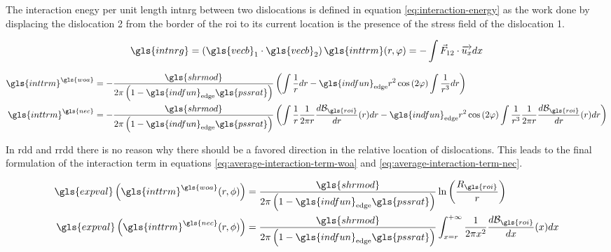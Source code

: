 \bigskip

The interaction enegy per unit length \gls{intnrg} between two dislocations is defined in equation \eqref{eq:interaction-energy} as the work done by displacing the dislocation 2 from the border of the \gls{roi} to its current location is the presence of the stress field of the dislocation 1.

\begin{equation}\label{eq:interaction-energy}
  \gls{intnrg} =
  \left( \gls{vecb}_1 \cdot \gls{vecb}_2 \right) \gls{inttrm}(r, \varphi) =
  - \int \vec{F}_{1 2} \cdot \ux dx
\end{equation}

\begin{align}
  \gls{inttrm}^{\gls{woa}} &=
    - \frac{\gls{shrmod}}{2 \pi \left(1 - \gls{indfun}_{\mathrm{edge}} \gls{pssrat} \right)} \left( \int \frac{1}{r} dr - \gls{indfun}_{\mathrm{edge}} r^2 \cos \left( 2 \varphi \right) \int \frac{1}{r^3} dr \right)
    \label{eq:interaction-term-woa}
  \\
  \gls{inttrm}^{\gls{nec}} &=
    - \frac{\gls{shrmod}}{2 \pi \left(1 - \gls{indfun}_{\mathrm{edge}} \gls{pssrat} \right)} \left( \int \frac{1}{r} \frac{1}{2 \pi r} \frac{d \mathcal{B}_{\gls{roi}}}{dr} (r) dr - \gls{indfun}_{\mathrm{edge}} r^2 \cos \left( 2 \varphi \right) \int \frac{1}{r^3} \frac{1}{2 \pi r} \frac{d \mathcal{B}_{\gls{roi}}}{dr} (r) dr \right)
    \label{eq:interaction-term-nec}
\end{align}

\bigskip

In \gls{rdd} and \gls{rrdd} there is no reason why there should be a favored direction in the relative location of dislocations.
This leads to the final formulation of the interaction term in equations \eqref{eq:average-interaction-term-woa} and \eqref{eq:average-interaction-term-nec}.

\begin{align}
  \gls{expval} \left( \gls{inttrm}^{\gls{woa}}(r, \phi) \right) &=
    \frac{\gls{shrmod}}{2 \pi \left(1 - \gls{indfun}_{\mathrm{edge}} \gls{pssrat} \right)} \ln \left( \frac{R_{\gls{roi}}}{r} \right)
    \label{eq:average-interaction-term-woa}
  \\
  \gls{expval} \left( \gls{inttrm}^{\gls{nec}}(r, \phi) \right) &=
    \frac{\gls{shrmod}}{2 \pi \left(1 - \gls{indfun}_{\mathrm{edge}} \gls{pssrat} \right)} \int_{x=r}^{+ \infty} \frac{1}{2 \pi x^2} \frac{d \mathcal{B}_{\gls{roi}}}{dx} (x) dx
    \label{eq:average-interaction-term-nec}
\end{align}

